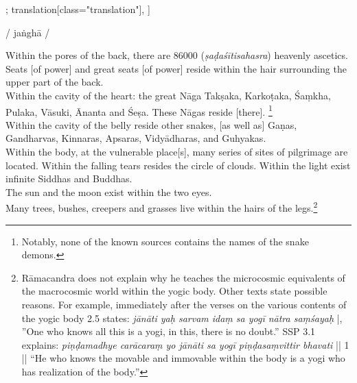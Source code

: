 \begin{alignment}[
  texts=edition[class="edition"];
  translation[class="translation"],
  ]
\begin{edition}
\begin{prose}[p41_02]
{  
}
/
jaṅghā
/
    \end{prose}
  \end{edition}
  \begin{translation}
    \begin{tlate}[p41_02]
      \noindent
Within the pores of the back, there are 86000 (\textit{ṣaḍaśītisahasra}) heavenly ascetics. Seats [of power] and great seats [of power] reside within the hair surrounding the upper part of the back.\\

Within the cavity of the heart: the great Nāga Takṣaka, Karkoṭaka, Śaṃkha, Pulaka, Vāsuki, Ānanta and Śeṣa. These Nāgas reside [there]. \footnote{Notably, none of the known sources contains the names of the snake demons.}\\

Within the cavity of the belly reside other snakes, [as well as] Gaṇas, Gandharvas, Kinnaras, Apsaras, Vidyādharas, and Guhyakas.\\

Within the body, at the vulnerable place[s], many series of sites of pilgrimage are located. Within the falling tears resides the circle of clouds. Within the light exist infinite Siddhas and Buddhas.\\

The sun and the moon exist within the two eyes.\\

Many trees, bushes, creepers and grasses live within the hairs of the legs.\footnote{Rāmacandra does not explain why he teaches the microcosmic equivalents of the macrocosmic world within the yogic body. Other texts state possible reasons. For example, immediately after the verses on the various contents of the yogic body  2.5 states: \textit{jānāti yaḥ sarvam idaṃ sa yogī nātra saṃśayaḥ} |, ''One who knows all this is a yogi, in this, there is no doubt.'' SSP 3.1 explains: \textit{piṇḍamadhye carācaraṃ yo jānāti sa yogī piṇḍasaṃvittir bhavati} || 1 || ``He who knows the movable and immovable within the body is a yogi who has realization of the body.''}
\flushpage
    \end{tlate}
  \end{translation}
\end{alignment}
